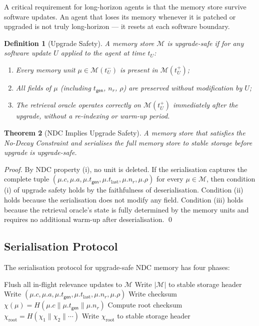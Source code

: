 \documentclass[12pt]{article}
\newtheorem{theorem}{Theorem}
\newtheorem{definition}[theorem]{Definition}
\newcommand{\MEM}{\mathcal{M}}
\newcommand{\GEN}{\mathsf{gen}}
\begin{document}
A critical requirement for long-horizon agents is that the memory store survive
software updates.  An agent that loses its memory whenever it is patched or
upgraded is not truly long-horizon — it resets at each software boundary.

\begin{definition}[Upgrade Safety]
  A memory store $\MEM$ is \emph{upgrade-safe} if for any software update
  $U$ applied to the agent at time $t_U$:
  \begin{enumerate}[label=(\roman*)]
    \item Every memory unit $\mu \in \MEM(t_U^-)$ is present in $\MEM(t_U^+)$;
    \item All fields of $\mu$ (including $t_\GEN$, $n_r$, $\rho$) are preserved
      without modification by $U$;
    \item The retrieval oracle operates correctly on $\MEM(t_U^+)$ immediately
      after the upgrade, without a re-indexing or warm-up period.
  \end{enumerate}
\end{definition}

\begin{theorem}[NDC Implies Upgrade Safety]
  A memory store that satisfies the No-Decay Constraint and serialises the
  full memory store to stable storage before upgrade is upgrade-safe.
\end{theorem}

\begin{proof}
  By NDC property (i), no unit is deleted.  If the serialisation captures
  the complete tuple $(\mu.c, \mu.a, \mu.t_\GEN, \mu.t_\text{last}, \mu.n_r,
  \mu.\rho)$ for every $\mu \in \MEM$, then condition (i) of upgrade safety
  holds by the faithfulness of deserialisation.  Condition (ii) holds because
  the serialisation does not modify any field.  Condition (iii) holds because
  the retrieval oracle's state is fully determined by the memory units and
  requires no additional warm-up after deserialisation. \qed
\end{proof}

\subsection{Serialisation Protocol}

The serialisation protocol for upgrade-safe NDC memory has four phases:

\begin{algorithm}[h]
  \caption{Pre-upgrade serialisation}
  \label{alg:serial}
  \begin{algorithmic}[1]
    \State Flush all in-flight relevance updates to $\MEM$
    \State Write $|\MEM|$ to stable storage header
    \For{each $\mu \in \MEM$}
      \State Write $(\mu.c, \mu.a, \mu.t_\GEN, \mu.t_\text{last}, \mu.n_r, \mu.\rho)$
      \State Write checksum $\chi(\mu) = H(\mu.c \| \mu.t_\GEN \| \mu.n_r)$
    \EndFor
    \State Compute root checksum $\chi_\text{root} = H(\chi_1 \| \chi_2 \| \cdots)$
    \State Write $\chi_\text{root}$ to stable storage header
  \end{algorithmic}
\end{algorithm}
\end{document}
